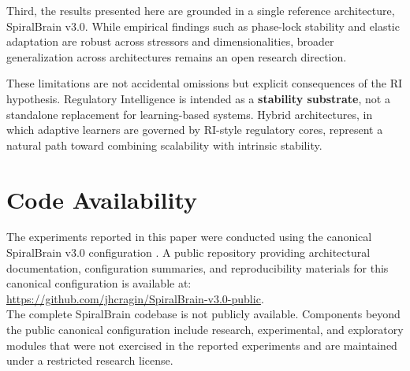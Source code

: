 \documentclass[12pt,a4paper]{report}
\begin{document}
Third, the results presented here are grounded in a single reference architecture, SpiralBrain v3.0. While empirical findings such as phase-lock stability and elastic adaptation are robust across stressors and dimensionalities, broader generalization across architectures remains an open research direction.

These limitations are not accidental omissions but explicit consequences of the RI hypothesis. Regulatory Intelligence is intended as a \textbf{stability substrate}, not a standalone replacement for learning-based systems. Hybrid architectures, in which adaptive learners are governed by RI-style regulatory cores, represent a natural path toward combining scalability with intrinsic stability.

\section{Code Availability}

The experiments reported in this paper were conducted using the canonical SpiralBrain v3.0 configuration \cite{SpiralBrainV3}.
A public repository providing architectural documentation, configuration summaries, and reproducibility materials for this canonical configuration is available at: \\
\url{https://github.com/jhcragin/SpiralBrain-v3.0-public}. \\

The complete SpiralBrain codebase is not publicly available. Components beyond the public canonical configuration include research, experimental, and exploratory modules that were not exercised in the reported experiments and are maintained under a restricted research license.



\end{document}
